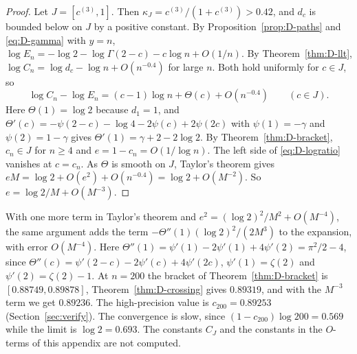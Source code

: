\begin{proof}
Let $J=[c^{(3)},1]$. Then $\kappa_J=c^{(3)}/(1+c^{(3)})>0.42$, and $d_c$ is bounded below on
$J$ by a positive constant. By Proposition~\ref{prop:D-paths} and \eqref{eq:D-gamma} with
$y=n$, $\log E_n=-\log2-\log\Gamma(2-c)-c\log n+O(1/n)$. By Theorem~\ref{thm:D-llt},
$\log C_n=\log d_c-\log n+O(n^{-0.4})$ for large $n$. Both hold uniformly for $c\in J$, so
\begin{equation}\label{eq:D-logratio}
\log C_n-\log E_n=(c-1)\log n+\Theta(c)+O(n^{-0.4})\qquad(c\in J).
\end{equation}
Here $\Theta(1)=\log2$ because $d_1=1$, and
$\Theta'(c)=-\psi(2-c)-\log4-2\psi(c)+2\psi(2c)$ with $\psi(1)=-\gamma$ and $\psi(2)=1-\gamma$
gives $\Theta'(1)=\gamma+2-2\log2$. By Theorem~\ref{thm:D-bracket}, $c_n\in J$ for $n\ge4$ and
$e=1-c_n=O(1/\log n)$. The left side of \eqref{eq:D-logratio} vanishes at $c=c_n$. As $\Theta$
is smooth on $J$, Taylor's theorem gives $eM=\log2+O(e^2)+O(n^{-0.4})=\log2+O(M^{-2})$. So
$e=\log2/M+O(M^{-3})$.
\end{proof}

With one more term in Taylor's theorem and $e^2=(\log2)^2/M^2+O(M^{-4})$, the same argument
adds the term $-\Theta''(1)(\log2)^2/(2M^3)$ to the expansion, with error $O(M^{-4})$. Here
$\Theta''(1)=\psi'(1)-2\psi'(1)+4\psi'(2)=\pi^2/2-4$, since
$\Theta''(c)=\psi'(2-c)-2\psi'(c)+4\psi'(2c)$, $\psi'(1)=\zeta(2)$ and $\psi'(2)=\zeta(2)-1$.
At $n=200$ the bracket of Theorem~\ref{thm:D-bracket} is
$[0.88749,0.89878]$, Theorem~\ref{thm:D-crossing} gives $0.89319$, and with the $M^{-3}$ term
we get $0.89236$. The high-precision value is $c_{200}=0.89253$ (Section~\ref{sec:verify}). The
convergence is slow, since $(1-c_{200})\log200=0.569$ while the limit is $\log2=0.693$. The
constants $C_J$ and the constants in the $O$-terms of this appendix are not computed.
